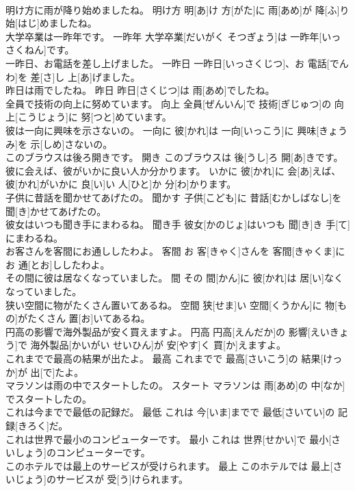 \documentclass[8pt]{extreport}
\begin{document}
\begin{CJK}{UTF8}{min}
\\	明け方に雨が降り始めましたね。	明け方	明[あ]け 方[がた]に 雨[あめ]が 降[ふ]り 始[はじ]めましたね。	
\\	大学卒業は一昨年です。	一昨年	大学卒業[だいがく そつぎょう]は 一昨年[いっさくねん]です。	
\\	一昨日、お電話を差し上げました。	一昨日	一昨日[いっさくじつ]、お 電話[でんわ]を 差[さ]し 上[あ]げました。	
\\	昨日は雨でしたね。	昨日	昨日[さくじつ]は 雨[あめ]でしたね。	
\\	全員で技術の向上に努めています。	向上	全員[ぜんいん]で 技術[ぎじゅつ]の 向上[こうじょう]に 努[つと]めています。	
\\	彼は一向に興味を示さないの。	一向に	彼[かれ]は 一向[いっこう]に 興味[きょうみ]を 示[しめ]さないの。	
\\	このブラウスは後ろ開きです。	開き	このブラウスは 後[うし]ろ 開[あ]きです。	
\\	彼に会えば、彼がいかに良い人か分かります。	いかに	彼[かれ]に 会[あ]えば、 彼[かれ]がいかに 良[い]い 人[ひと]か 分[わ]かります。	
\\	子供に昔話を聞かせてあげたの。	聞かす	子供[こども]に 昔話[むかしばなし]を 聞[き]かせてあげたの。	
\\	彼女はいつも聞き手にまわるね。	聞き手	彼女[かのじょ]はいつも 聞[き]き 手[て]にまわるね。	
\\	お客さんを客間にお通ししたわよ。	客間	お 客[きゃく]さんを 客間[きゃくま]にお 通[とお]ししたわよ。	
\\	その間に彼は居なくなっていました。	間	その 間[かん]に 彼[かれ]は 居[い]なくなっていました。	
\\	狭い空間に物がたくさん置いてあるね。	空間	狭[せま]い 空間[くうかん]に 物[もの]がたくさん 置[お]いてあるね。	
\\	円高の影響で海外製品が安く買えますよ。	円高	円高[えんだか]の 影響[えいきょう]で 海外製品[かいがい せいひん]が 安[やす]く 買[か]えますよ。	
\\	これまでで最高の結果が出たよ。	最高	これまでで 最高[さいこう]の 結果[けっか]が 出[で]たよ。	
\\	マラソンは雨の中でスタートしたの。	スタート	マラソンは 雨[あめ]の 中[なか]でスタートしたの。	
\\	これは今までで最低の記録だ。	最低	これは 今[いま]までで 最低[さいてい]の 記録[きろく]だ。	
\\	これは世界で最小のコンピューターです。	最小	これは 世界[せかい]で 最小[さいしょう]のコンピューターです。	
\\	このホテルでは最上のサービスが受けられます。	最上	このホテルでは 最上[さいじょう]のサービスが 受[う]けられます。	

\end{CJK}
\end{document}
